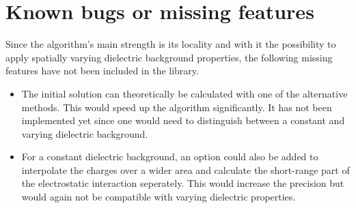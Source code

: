 \section{Known bugs or missing features}

Since the algorithm's main strength is its locality and with it the possibility to apply spatially varying dielectric background properties, the following missing features have not been included in the \project{} library.

\begin{itemize}
\item The initial solution can theoretically be calculated with one of the alternative methods. This would speed up the algorithm significantly. It has not been implemented yet since one would need to distinguish between a constant and varying dielectric background.
\item For a constant dielectric background, an option could also be added to interpolate the charges over a wider area and calculate the short-range part of the electrostatic interaction seperately. This would increase the precision but would again not be compatible with varying dielectric properties.
\end{itemize}



